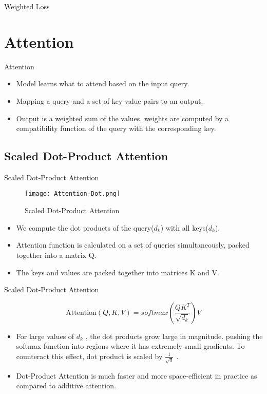 \documentclass[10pt]{beamer}
\begin{document}
\begin{frame}{Weighted Loss}
	
\end{frame}

\section{Attention}
\begin{frame}{Attention}
	\begin{itemize}
		\item Model learns what to attend based on the input query.
		\item Mapping a query and a set of key-value pairs to an output.
		\item Output is a weighted sum of the values, weights are computed by a compatibility function of the query with the corresponding key.
	\end{itemize}

\end{frame}

\subsection{Scaled Dot-Product Attention}

\begin{frame}{Scaled Dot-Product Attention}
	\begin{figure}[ht!]
		\centering
		\texttt{[image: Attention-Dot.png]}
		\caption{Scaled Dot-Product Attention }
		\label{fig:dot-attention}
	\end{figure}
	\vspace{-20}
	\begin{itemize}
		\item We compute the dot products of the
			query($d_k$) with all keys($d_k$).
		\item Attention function is calculated on a set of queries simultaneously, packed together into a matrix Q.
		\item The keys and values are packed together into matrices K and V.
	\end{itemize}

\end{frame}
\begin{frame}{Scaled Dot-Product Attention}
	\begin{center}
		\[
			\text{Attention}(Q, K, V) = softmax(\frac{QK^{T}}{\sqrt{d_k}}) V
		\]
	\end{center}
	\begin{itemize}
		\item For large values of $d_k$ , the dot products grow large in magnitude. pushing the softmax function into regions where it has extremely small gradients. To counteract this effect, dot product is scaled by $\frac{1}{\sqrt{d}}$ .
		\item Dot-Product Attention is much faster and more space-efficient in practice as compared to additive attention.
	\end{itemize}
\end{frame}
\end{document}
